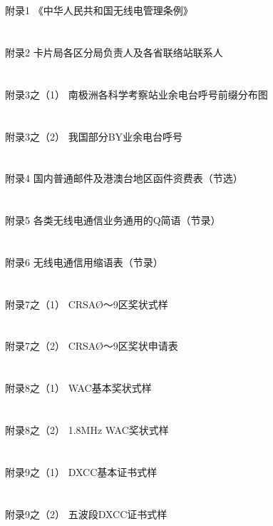 \documentclass[12pt,UTF8]{ctexbook}
\begin{document}
\section{}附录1 《中华人民共和国无线电管理条例》
\section{}附录2 卡片局各区分局负责人及各省联络站联系人
\section{}附录3之（1） 南极洲各科学考察站业余电台呼号前缀分布图
\section{}附录3之（2） 我国部分BY业余电台呼号
\section{}附录4 国内普通邮件及港澳台地区函件资费表（节选）
\section{}附录5 各类无线电通信业务通用的Q简语（节录）
\section{}附录6 无线电通信用缩语表（节录）
\section{}附录7之（1） CRSAØ～9区奖状式样
\section{}附录7之（2） CRSAØ～9区奖状申请表
\section{}附录8之（1） WAC基本奖状式样
\section{}附录8之（2） 1.8MHz WAC奖状式样
\section{}附录9之（1） DXCC基本证书式样
\section{}附录9之（2） 五波段DXCC证书式样
\end{document}
